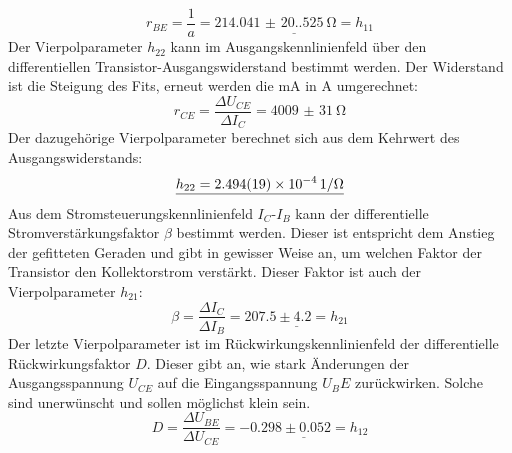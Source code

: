 \documentclass[12pt,a4paper,ngerman]{report}
\begin{document}
	\begin{equation}
		r_{BE} = \frac{1}{a} = \underline{\SI{214.041(20.525)}{\ohm} = h_{11}}
	\end{equation}
	Der Vierpolparameter $h_22$ kann im Ausgangskennlinienfeld über den differentiellen Transistor-Ausgangswiderstand bestimmt werden. Der Widerstand ist die Steigung des Fits, erneut werden die \si{\milli \ampere} in \si{\ampere} umgerechnet:
	\begin{equation}
		r_{CE} =  \frac{\Delta U_{CE}}{\Delta I_{C}} = \SI{4009(31)}{\ohm}
	\end{equation}
	Der dazugehörige Vierpolparameter berechnet sich aus dem Kehrwert des Ausgangswiderstands:
	\begin{equation}
		\underline{h_{22} = \SI{2.494(19)E-4}{1 \per \ohm}}
	\end{equation}
	Aus dem Stromsteuerungskennlinienfeld $I_C$-$I_B$ kann der differentielle Stromverstärkungsfaktor $\beta$ bestimmt werden. Dieser ist entspricht dem Anstieg der gefitteten Geraden und gibt in gewisser Weise an, um welchen Faktor der Transistor den Kollektorstrom verstärkt. Dieser Faktor ist auch der Vierpolparameter $h_{21}$:
	\begin{equation}
		\beta =  \frac{\Delta I_{C}}{\Delta I_{B}} = \underline{207.5 \pm 4.2 = h_{21}}
	\end{equation}
	Der letzte Vierpolparameter ist im Rückwirkungskennlinienfeld der differentielle Rückwirkungsfaktor $D$. Dieser gibt an, wie stark Änderungen der Ausgangsspannung $U_{CE}$ auf die Eingangsspannung $U_BE$ zurückwirken. Solche sind unerwünscht und sollen möglichst klein sein. 
	\begin{equation}
		 D = \frac{\Delta U_{BE}}{\Delta U_{CE}} = \underline{-0.298 \pm 0.052 = h_{12}}
	\end{equation}
\end{document}
